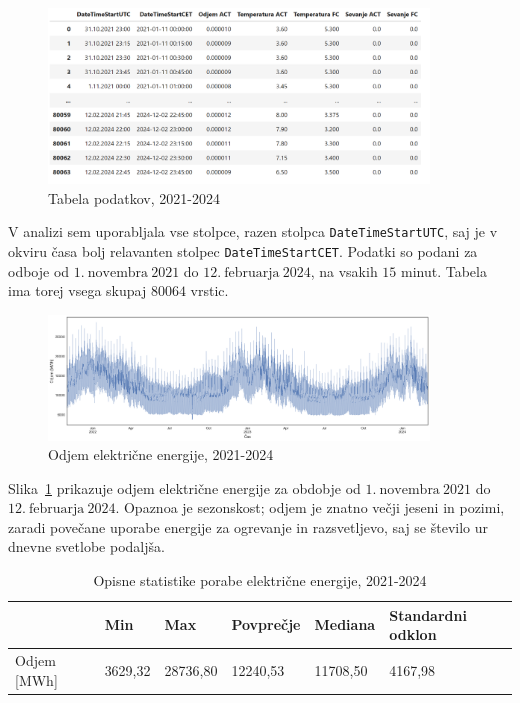 \documentclass[a4paper, 11pt]{article}
\begin{document}
\begin{figure}[h!]
    \centering
    \caption{Tabela podatkov, 2021-2024}\par\medskip
    \includegraphics[width=0.9\textwidth]{tabela.png}
\end{figure}

\noindent V analizi sem uporabljala vse stolpce, razen stolpca \texttt{DateTimeStartUTC}, saj je v 
okviru časa bolj relavanten stolpec \texttt{DateTimeStartCET}. Podatki so podani za odboje od $1.~\text{novembra}~2021$ do $12.~\text{februarja}~2024$,
na vsakih $15$ minut. Tabela ima torej vsega skupaj $80064$ vrstic. \\

\begin{figure}[h!]
    \centering
    \caption{Odjem električne energije, 2021-2024}\par\medskip
    \label{fig:odjem_EE}
    \includegraphics[width=0.9\textwidth]{odjem_EE.png}
\end{figure}

\noindent Slika~\ref{fig:odjem_EE} prikazuje odjem električne energije za obdobje od 
$1.~\text{novembra}~2021$ do $12.~\text{februarja}~2024$. 
Opaznoa je sezonskost; odjem je znatno večji jeseni in pozimi, zaradi povečane uporabe energije za ogrevanje in 
razsvetljevo, saj se število ur dnevne svetlobe podaljša. 

\begin{table}[!h]
    \centering
    \caption{Opisne statistike porabe električne energije, 2021-2024}\par\medskip
    \label{Tab:opisne_statistike}
    \begin{tabular}{l||l|l|l|l|l}
              & Min & Max & Povprečje & Mediana & Standardni odklon \\ \hline \hline
        Odjem [MWh] & 3629,32 & 28736,80 & 12240,53 & 11708,50 & 4167,98 \\ 
    \end{tabular}
\end{table}
\end{document}
